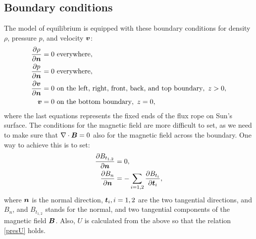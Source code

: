 \subsection{Boundary conditions}
The model of equilibrium is equipped with these boundary conditions for density $\rho$, pressure $p$, and velocity $\mbox{\boldmath $v$}$:
\begin{align}
\frac{\partial \rho}{\partial \mbox{\boldmath $n$}} & = 0\ \text{everywhere},\\
\frac{\partial p}{\partial \mbox{\boldmath $n$}} & = 0\ \text{everywhere},\\
\frac{\partial \mbox{\boldmath $v$}}{\partial \mbox{\boldmath $n$}} & = 0\ \text{on the left, right, front, back, and top boundary},\ z > 0,\\
\mbox{\boldmath $v$} & = 0\ \text{on the bottom boundary},\ z = 0,\\
\end{align}
where the last equations represents the fixed ends of the flux rope on Sun's surface.
The conditions for the magnetic field are more difficult to set, as we need to make sure that $\nabla \cdot \mbox{\boldmath $B$} = 0$ also for the magnetic field across the boundary.
One way to achieve this is to set:
\begin{align}
\frac{\partial B_{t_{1,2}}}{\partial \mbox{\boldmath $n$}} & = 0,\\
\frac{\partial B_n}{\partial \mbox{\boldmath $n$}} & = -\sum_{i = 1, 2}\frac{\partial B_{t_{i}}}{\partial \mbox{\boldmath $t$}_{i}},
\end{align}
where $\mbox{\boldmath $n$}$ is the normal direction, $\mbox{\boldmath $t$}_{i}, i = 1, 2$ are the two tangential directions, and $B_n$, and $B_{t_{1,2}}$ stands for the normal, and two tangential components of the magnetic field $\mbox{\boldmath $B$}$. Also, $U$ is calculated from the above so that the relation \cref{presU} holds.

